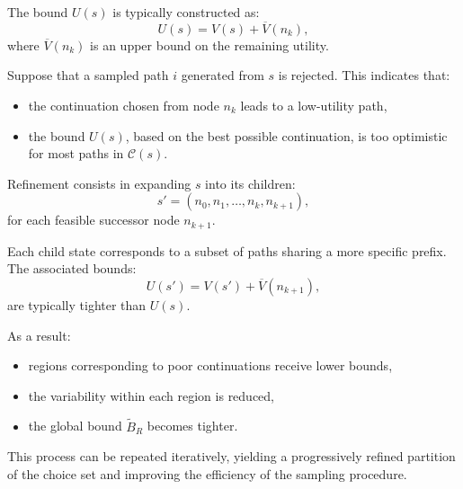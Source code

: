 \documentclass[11pt]{article}
\begin{document}
The bound $U(s)$ is typically constructed as:
\[
U(s) = V(s) + \overline{V}(n_k),
\]
where $\overline{V}(n_k)$ is an upper bound on the remaining utility.

Suppose that a sampled path $i$ generated from $s$ is rejected. This indicates that:
\begin{itemize}
\item the continuation chosen from node $n_k$ leads to a low-utility path,
\item the bound $U(s)$, based on the best possible continuation, is too optimistic for most paths in $\mathcal{C}(s)$.
\end{itemize}

Refinement consists in expanding $s$ into its children:
\[
s' = (n_0, n_1, \dots, n_k, n_{k+1}),
\]
for each feasible successor node $n_{k+1}$.

Each child state corresponds to a subset of paths sharing a more specific prefix. The associated bounds:
\[
U(s') = V(s') + \overline{V}(n_{k+1}),
\]
are typically tighter than $U(s)$.

As a result:
\begin{itemize}
\item regions corresponding to poor continuations receive lower bounds,
\item the variability within each region is reduced,
\item the global bound $\widetilde{B}_R$ becomes tighter.
\end{itemize}

This process can be repeated iteratively, yielding a progressively refined partition of the choice set and improving the efficiency of the sampling procedure.
\end{document}
